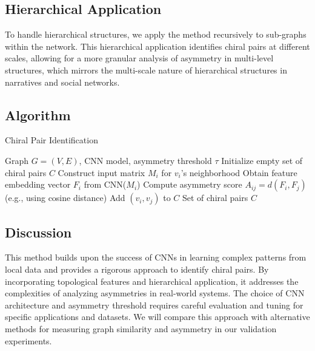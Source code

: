 \documentclass[12pt, a4paper]{article}
\begin{document}
\subsection{Hierarchical Application}

To handle hierarchical structures, we apply the method recursively to sub-graphs within the network. This hierarchical application identifies chiral pairs at different scales, allowing for a more granular analysis of asymmetry in multi-level structures, which mirrors the multi-scale nature of hierarchical structures in narratives and social networks.


\subsection{Algorithm}


\begin{algorithm}[H]
\caption{Chiral Pair Identification}
\begin{algorithmic}[1]
\Require Graph $G=(V,E)$, CNN model, asymmetry threshold $\tau$
\State Initialize empty set of chiral pairs $C$
    \State Construct input matrix $M_i$ for $v_i$'s neighborhood
    \State Obtain feature embedding vector $F_i$ from CNN($M_i$)
\EndFor
{}
    \State Compute asymmetry score $A_{ij} = d(F_i, F_j)$ (e.g., using cosine distance)
        \State Add $(v_i, v_j)$ to $C$
    \EndIf
\EndFor
\State \Return Set of chiral pairs $C$
\end{algorithmic}
\end{algorithm}


\subsection{Discussion}

This method builds upon the success of CNNs in learning complex patterns from local data and provides a rigorous approach to identify chiral pairs.  By incorporating topological features and hierarchical application, it addresses the complexities of analyzing asymmetries in real-world systems.  The choice of CNN architecture and asymmetry threshold requires careful evaluation and tuning for specific applications and datasets.  We will compare this approach with alternative methods for measuring graph similarity and asymmetry in our validation experiments.

 
\end{document}
